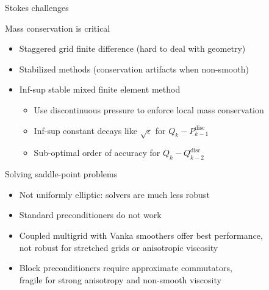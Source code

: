 \documentclass{beamer}
\begin{document}
\begin{frame}{Stokes challenges}
  \begin{block}{Mass conservation is critical}
    \begin{itemize}
    \item Staggered grid finite difference (hard to deal with geometry)
    \item Stabilized methods (conservation artifacts when non-smooth)
    \item Inf-sup stable mixed finite element method
      \begin{itemize}
      \item Use discontinuous pressure to enforce local mass conservation
      \item Inf-sup constant decays like $\sqrt{\epsilon}$ for $Q_k-P_{k-1}^{\text{disc}}$
      \item Sub-optimal order of accuracy for $Q_k-Q_{k-2}^{\text{disc}}$
      \end{itemize}
    \end{itemize}      
  \end{block}
  \begin{block}{Solving saddle-point problems}
    \begin{itemize}
    \item Not uniformly elliptic: solvers are much less robust
    \item Standard preconditioners do not work
    \item Coupled multigrid with Vanka smoothers offer best performance,\\
      \quad not robust for stretched grids or anisotropic viscosity
    \item Block preconditioners require approximate commutators, \\
      \quad fragile for strong anisotropy and non-smooth viscosity
    \end{itemize}
  \end{block}
\end{frame}
\end{document}
